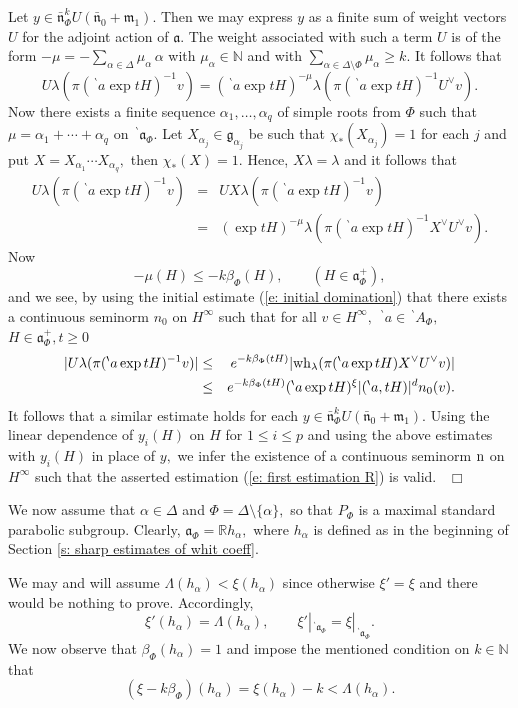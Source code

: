 \documentclass[12pt,a4paper]{article}
\def\proof{\par\noindent{\it Proof.}{\ }{\ }}
\def\qed{~\hfill\hbox{$\Box$}\medbreak}
\def\qquad{\quad\quad}
\def\msy#1{{\mathbb #1}}
\def\N{{\msy N}}
\def\R{{\msy R}}
\def\ga{\alpha}
\def\gb{\beta}
\def\gl{\lambda}
\def\gD{\Delta}
\def\got#1{\mathfrak #1}
\def\fa{{\got a}}
\def\fg{{\got g}}
\def\fm{{\got m}}
\def\fn{{\got n}}
\numberwithin{Thm}{section}
\numberwithin{equation}{section}
\def\bfn{\bar\fn}
\def\gL{\Lambda}
\numberwithin{equation}{section}
\def\gL{\Lambda}
\def\bfn{{\bar \fn}}
\def\bp{\!{\,}^\backprime}
\def\wh{{\rm wh}}
\def\cchi{\chi}
\def\veec{\vee}%
\begin{document}
\proof
Let $y \in \bar \fn_\Phi^k U(\bar \fn_0 + \fm_1).$ Then we may express $y$ as a finite 
sum of weight vectors $U$ for the adjoint action of $\fa.$ The weight associated with
such a term $U$ is of the form $-\mu = - \sum_{\ga \in \gD} \mu_\ga\, \ga$ with  $\mu_\ga \in \N$ 
and with $\sum_{\ga \in \gD\setminus \Phi} \mu_\ga \geq k.$ It follows
that 
$$
U \gl (\pi(\bp a \exp tH)^{-1} v) = (\bp a\exp tH)^{-\mu} \gl (\pi(\bp a \exp tH)^{-1} U^\veec v).
$$%
Now there exists a finite sequence $\ga_1, \dots, \ga_q$ of simple roots
from $\Phi$ such that $\mu = \ga_1 + \cdots + \ga_q$ on $\bp \fa_\Phi.$ 
Let $X_{\ga_j} \in \fg_{\ga_j}$ be such that $\cchi_*(X_{\ga_j}) = 1$ 
for each $j$ and put $X = X_{\ga_1}\cdots X_{\ga_q},$ then $\cchi_*(X) = 1.$ 
Hence,  $X \gl = \gl$ and  it follows that
\begin{eqnarray*}
U \gl (\pi(\bp a \exp tH)^{-1} v) & = &  U X \gl (\pi(\bp a \exp tH)^{-1} v)\\
&=&  
(\exp tH)^{-\mu} \gl (\pi(\bp a \exp tH)^{-1} X^\veec U^\veec v).
\end{eqnarray*} 
Now  
$$
-\mu(H)  \leq -k \gb_\Phi(H), \qquad (H \in \fa_\Phi^+),
$$%
and we see, by using the initial estimate (\ref{e: initial domination}) that there exists a continuous seminorm $n_0$ on $H^\infty$ 
such that for all $v \in H^\infty,$ $\bp a\in \bp A_\Phi,$ $H \in \fa_\Phi^+, t\geq 0$ 
\begin{eqnarray*}
|U \gl (\pi(\bp a \exp tH)^{-1} v)| 
& \leq & e^{-k\gb_\Phi( t H)} |\wh_\gl(\pi(\bp a \exp tH) X^\veec U^\veec v )|\\
& \leq & 
e^{-k\gb_\Phi( t H)} (\bp a \exp tH)^\xi |(\bp a, tH)|^d n_0(v).
\end{eqnarray*}
It follows that a similar estimate holds for each $y \in \bfn_\Phi^kU(\bfn_0 + \fm_1).$ 
Using the linear dependence of  $y_i(H)$ on $H$ for $1 \leq i \leq p$ 
and using the above estimates with $y_i(H)$ in place of $y,$ 
we infer the existence of a continuous seminorm ${\rm n}$ on $H^\infty$ such that
the asserted estimation (\ref{e: first estimation R}) is valid.
\qed

We now assume that  $\ga \in \gD$ and $\Phi = \gD\setminus \{\ga\},$ 
so that $P_\Phi$ is a maximal standard parabolic subgroup. Clearly,
$\fa_\Phi = \R h_\ga,$ where $h_\ga$ is defined as in the beginning 
of Section \ref{s: sharp estimates of whit coeff}.


We may and will assume $\gL(h_\ga) < \xi(h_\ga)$ 
since otherwise $\xi' = \xi$ and there would be nothing to prove.
Accordingly,
\begin{equation}\label{e: xi prime on h ga}
\xi'(h_\ga) = \gL(h_\ga),\qquad  \xi'|_{\bp \fa_\Phi}  = \xi|_{\bp \fa_\Phi}.
\end{equation} 
We now observe that $\gb_\Phi(h_\ga) = 1$ and 
impose the mentioned condition on $k \in \N$  that 
\begin{equation}
\label{e: condition on k}
(\xi  - k \gb_\Phi)(h_\ga) = \xi(h_\ga) - k  < \gL(h_\ga).
\end{equation}
 
\end{document}
